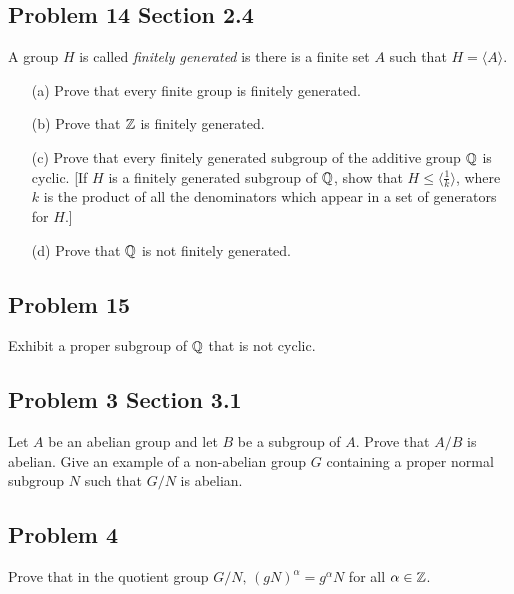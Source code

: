 \subsection{Problem 14 Section 2.4}
\begin{prob}
    A group $H$ is called \emph{finitely generated} is there is a finite set $A$ such that $H=\langle A \rangle $. 
    \begin{enumerate}
        \item[(a)] Prove that every finite group is finitely generated.
        \item[(b)] Prove that $\mathbb{Z}$ is finitely generated.
        \item[(c)] Prove that every finitely generated subgroup of the additive group $\mathbb{Q}$ is cyclic. [If $H$ is a finitely generated subgroup of $\mathbb{Q}$, show that $H \leq \langle \frac{1}{k} \rangle $, where $k$ is the product of all the denominators which appear in a set of generators for $H$.]
        \item[(d)] Prove that $\mathbb{Q}$ is not finitely generated.
    \end{enumerate}
\end{prob}

\subsection{Problem 15}
\begin{prob}
    Exhibit a proper subgroup of $\mathbb{Q}$ that is not cyclic.
\end{prob}

\subsection{Problem 3 Section 3.1}
\begin{prob}
    Let $A$ be an abelian group and let $B$ be a subgroup of $A$. Prove that $A/B$ is abelian. Give an example of a non-abelian group $G$ containing a proper normal subgroup $N$ such that $G/N$ is abelian.
\end{prob}

\subsection{Problem 4}
\begin{prob}
    Prove that in the quotient group $G/N, \, (gN)^{\alpha}=g^{\alpha}N$ for all $\alpha\in \mathbb{Z}$.
\end{prob}
 
